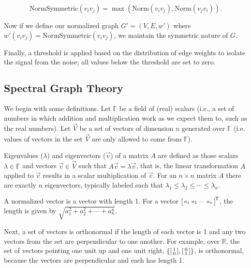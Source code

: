 \begin{equation}
	\text{NormSymmetric}(v_{i}v_{j}) = \max(\text{Norm}(v_{i}v_{j}), \text{Norm}(v_{j}v_{i})).
\end{equation}

Now if we define our normalized graph \(G' = (V, E, w')\) where \(w'(v_{i}v_{j}) = \text{NormSymmetric}(v_{i}v_{j})\), we maintain the symmetric nature of \(G\).

Finally, a threshold is applied based on the distribution of edge weights to isolate the signal from the noise; all values below the threshold are set to zero.

\subsection{Spectral Graph Theory}
\label{sec:spectralgraphtheory}

We begin with some definitions. Let \(\mathbb{F}\) be a field of (real) scalars (i.e., a set of numbers in which addition and multiplication work as we expect them to, such as the real numbers). Let \(\vec{V}\) be a set of vectors of dimension \(n\) generated over \(\mathbb{F}\) (i.e. values of vectors in the set \(\vec{V}\) are only allowed to come from \(\mathbb{F}\)).

Eigenvalues (\(\lambda\)) and eigenvectors (\(\vec{v}\)) of a matrix \(A\) are defined as those scalars \(\lambda \in \mathbb{F}\) and vectors \(\vec{v} \in \vec{V}\) such that \(A\vec{v} = \lambda\vec{v}\), that is, the linear transformation \(A\) applied to \(\vec{v}\) results in a scalar multiplication of \(\vec{v}\). For an \(n \times n\) matrix \(A\) there are exactly \(n\) eigenvectors, typically labeled such that \(\lambda_{1} \leq \lambda_{2} \leq \cdots \leq \lambda_{n}\).

A normalized vector is a vector with length \num{1}. For a vector \(\begin{bsmallmatrix}
a_{1} & a_{2} & \cdots & a_{n}
\end{bsmallmatrix}^{\mkern-1.5mu\mathsf{T}}\), the length is given by \(\sqrt{a_{1}^{2} + a_{2}^{2} + \cdots + a_{n}^{n}}\).

Next, a set of vectors is orthonormal if the length of each vector is \num{1} and any two vectors from the set are perpendicular to one another. For example, over \(\mathbb{R}\), the set of vectors pointing one unit up and one unit right, \(\left\{\begin{bsmallmatrix}
1 \\ 0
\end{bsmallmatrix}, \begin{bsmallmatrix}
0 \\ 1
\end{bsmallmatrix}\right\}\), is orthonormal, because the vectors are perpendicular and each has length \num{1}.


